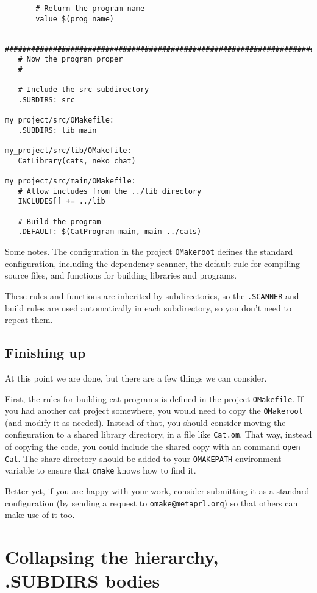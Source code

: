 \begin{verbatim}
       # Return the program name
       value $(prog_name)

   ########################################################################
   # Now the program proper
   #

   # Include the src subdirectory
   .SUBDIRS: src

my_project/src/OMakefile:
   .SUBDIRS: lib main

my_project/src/lib/OMakefile:
   CatLibrary(cats, neko chat)

my_project/src/main/OMakefile:
   # Allow includes from the ../lib directory
   INCLUDES[] += ../lib

   # Build the program
   .DEFAULT: $(CatProgram main, main ../cats)
\end{verbatim}

Some notes.  The configuration in the project \verb+OMakeroot+ defines the standard configuration, including
the dependency scanner, the default rule for compiling source files, and functions for building
libraries and programs.

These rules and functions are inherited by subdirectories, so the \verb+.SCANNER+ and build rules
are used automatically in each subdirectory, so you don't need to repeat them.

\subsection{Finishing up}

At this point we are done, but there are a few things we can consider.

First, the rules for building cat programs is defined in the project \verb+OMakefile+.  If you had
another cat project somewhere, you would need to copy the \verb+OMakeroot+ (and modify it as
needed).  Instead of that, you should consider moving the configuration to a shared library
directory, in a file like \verb+Cat.om+.  That way, instead of copying the code, you could include
the shared copy with an \OMake{} command \verb+open Cat+.  The share directory should be added to your
\verb+OMAKEPATH+ environment variable to ensure that \verb+omake+ knows how to find it.

Better yet, if you are happy with your work, consider submitting it as a standard configuration (by
sending a request to \verb+omake@metaprl.org+) so that others can make use of it too.

\section{Collapsing the hierarchy, .SUBDIRS bodies}

